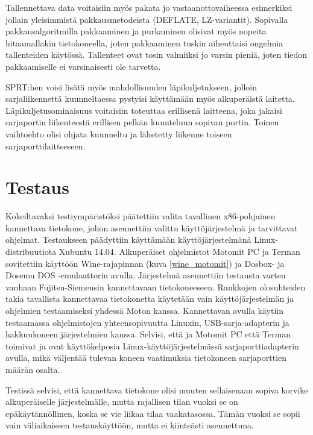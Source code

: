 Tallennettava data voitaisiin myös pakata jo vastaanottovaiheessa esimerkiksi jollain yleisimmistä pakkausmetodeista (DEFLATE, LZ-variantit). Sopivalla pakkausalgoritmilla pakkaaminen ja purkaminen olisivat myös nopeita hitaamallakin tietokoneella, joten pakkaaminen tuskin aiheuttaisi ongelmia tallenteiden käytössä. Tallenteet ovat tosin valmiiksi jo varsin pieniä, joten tiedon pakkaamiselle ei varsinaisesti ole tarvetta.

SPRT:hen voisi lisätä myös mahdollisuuden läpikuljetukseen, jolloin sarjaliikennettä kuunneltaessa pystyisi käyttämään myös alkuperäistä laitetta. Läpikuljetusominaisuus voitaisiin toteuttaa erillisenä laitteena, joka jakaisi sarjaportin liikenteestä erillisen pelkän kuunteluun sopivan portin. Toinen vaihtoehto olisi ohjata kuunneltu ja lähetetty liikenne toiseen sarjaporttilaitteeseen.

\section{Testaus}
Kokeiltavaksi testiympäristöksi päätettiin valita tavallinen x86-pohjainen kannettava tietokone, johon asennettiin valittu käyttöjärjestelmä ja tarvittavat ohjelmat. Testaukseen päädyttiin käyttämään käyttöjärjestelmänä Linux-distribuutiota Xubuntu 14.04. Alkuperäiset ohjelmistot Motomit PC ja Terman sovitettiin käyttöön Wine-rajapinnan (kuva \ref{wine_motomit}) ja Dosbox- ja Dosemu DOS -emulaattorin avulla. Järjestelmä asennettiin testausta varten vanhaan Fujitsu-Siemensin kannettavaan tietokoneeseen. Rankkojen olosuhteiden takia tavallista kannettavaa tietokonetta käytetään vain käyttöjärjestelmän ja ohjelmien testaamiseksi yhdessä Moton kanssa. Kannettavan avulla käytiin testaamassa ohjelmistojen yhteensopivuutta Linuxin, USB-sarja-adapterin ja hakkuukoneen järjestelmien kanssa. Selvisi, että ja Motomit PC että Terman toimivat ja ovat käyttökelposia Linux-käyttöjärjestelmässä sarjaporttiadapterin avulla, mikä väljentää tulevan koneen vaatimuksia tietokoneen sarjaporttien määrän osalta.

Testissä selvisi, että kannettava tietokone olisi muuten sellaisenaan sopiva korvike alkuperäiselle järjestelmälle, mutta rajallisen tilan vuoksi se on epäkäytännöllinen, koska se vie liikaa tilaa vaakatasossa. Tämän vuoksi se sopii vain väliaikaiseen testauskäyttöön, mutta ei kiinteästi asennettuna.


